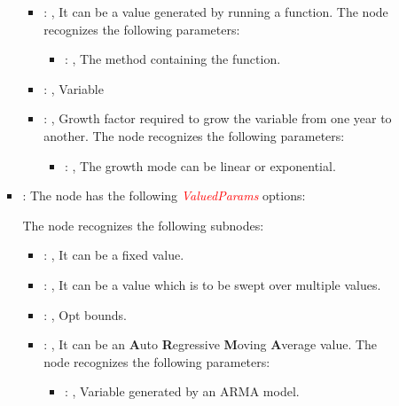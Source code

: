 \begin{itemize}
\begin{itemize}
\begin{itemize}
\begin{itemize}
                \item {}: , 
                  It can be a value generated by running a function.
                  The  node recognizes the following parameters:
                    \begin{itemize}
                      \item {}: , 
                        The method containing the function.
                  \end{itemize}

                \item {}: , 
                  Variable

                \item {}: , 
                  Growth factor required to grow the variable from one year to another.
                  The  node recognizes the following parameters:
                    \begin{itemize}
                      \item {}: , 
                        The growth mode can be linear or exponential.
                  \end{itemize}
              \end{itemize}

            \item {}:
              The node  has the following
              \textcolor{red}{\textit{ValuedParams}} options:

              The  node recognizes the following subnodes:
              \begin{itemize}
                \item {}: , 
                  It can be a fixed value.

                \item {}: , 
                  It can be a value which is to be swept over multiple values.

                \item {}: , 
                  Opt bounds.

                \item {}: , 
                  It can be an \textbf{A}uto \textbf{R}egressive \textbf{M}oving \textbf{A}verage
                  value.
                  The  node recognizes the following parameters:
                    \begin{itemize}
                      \item {}: , 
                        Variable generated by an ARMA model.
                  \end{itemize}


\end{itemize}
\end{itemize}
\end{itemize}
\end{itemize}
